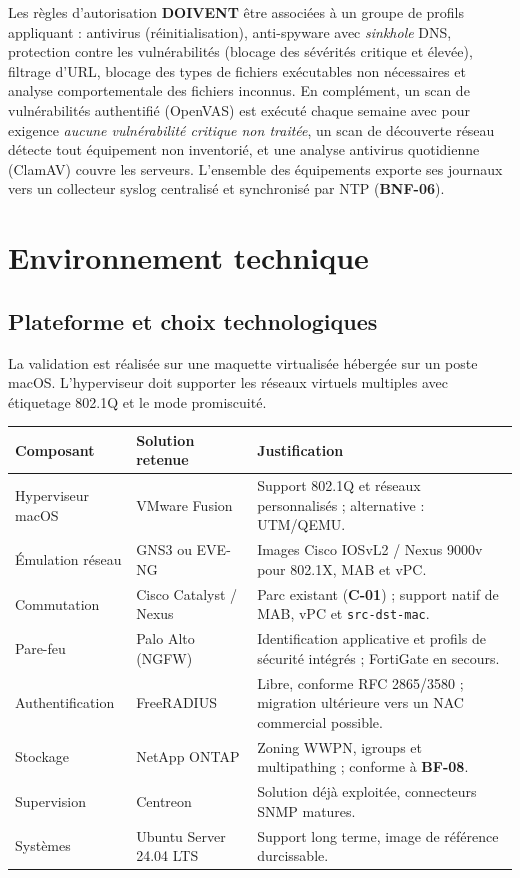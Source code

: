 \documentclass[11pt,a4paper]{article}
\newcommand{\ttb}[1]{\texttt{\small #1}}
\newcommand{\rid}[1]{\textcolor{primary}{\textbf{\small #1}}}
\begin{document}
Les règles d'autorisation \textbf{DOIVENT} être associées à un groupe de profils appliquant : antivirus (réinitialisation), anti-spyware avec \textit{sinkhole} DNS, protection contre les vulnérabilités (blocage des sévérités critique et élevée), filtrage d'URL, blocage des types de fichiers exécutables non nécessaires et analyse comportementale des fichiers inconnus. En complément, un scan de vulnérabilités authentifié (OpenVAS) est exécuté chaque semaine avec pour exigence \emph{aucune vulnérabilité critique non traitée}, un scan de découverte réseau détecte tout équipement non inventorié, et une analyse antivirus quotidienne (ClamAV) couvre les serveurs. L'ensemble des équipements exporte ses journaux vers un collecteur syslog centralisé et synchronisé par NTP (\rid{BNF-06}).

\section{Environnement technique}

\subsection{Plateforme et choix technologiques}
La validation est réalisée sur une maquette virtualisée hébergée sur un poste macOS. L'hyperviseur doit supporter les réseaux virtuels multiples avec étiquetage 802.1Q et le mode promiscuité.

\begin{table}[H]
\centering
\begin{tabularx}{\textwidth}{L{3.0cm} L{3.6cm} Y}
\toprule
{}\textbf{Composant} & \textbf{Solution retenue} & \textbf{Justification} \\
\midrule
Hyperviseur macOS & VMware Fusion & Support 802.1Q et réseaux personnalisés ; alternative : UTM/QEMU. \\
Émulation réseau & GNS3 ou EVE-NG & Images Cisco IOSvL2 / Nexus 9000v pour 802.1X, MAB et vPC. \\
Commutation & Cisco Catalyst / Nexus & Parc existant (\rid{C-01}) ; support natif de MAB, vPC et \ttb{src-dst-mac}. \\
Pare-feu & Palo Alto (NGFW) & Identification applicative et profils de sécurité intégrés ; FortiGate en secours. \\
Authentification & FreeRADIUS & Libre, conforme RFC 2865/3580 ; migration ultérieure vers un NAC commercial possible. \\
Stockage & NetApp ONTAP & Zoning WWPN, igroups et multipathing ; conforme à \rid{BF-08}. \\
Supervision & Centreon & Solution déjà exploitée, connecteurs SNMP matures. \\
Systèmes & Ubuntu Server 24.04 LTS & Support long terme, image de référence durcissable. \\
\bottomrule
\end{tabularx}
\end{table}
\end{document}
